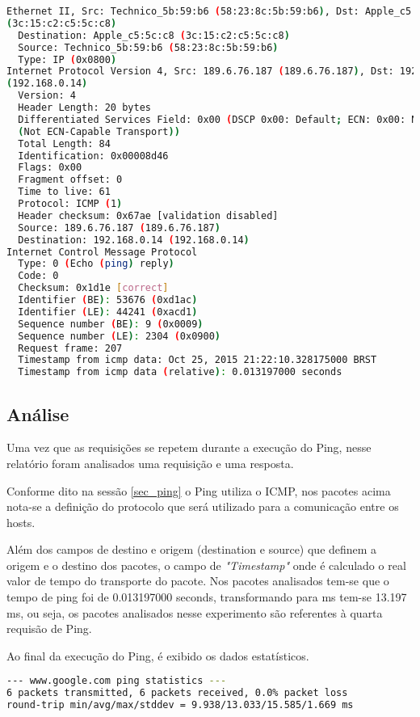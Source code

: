 \documentclass[a4paper]{report} %
\begin{document}
\begin{lstlisting}[language=bash]
Ethernet II, Src: Technico_5b:59:b6 (58:23:8c:5b:59:b6), Dst: Apple_c5:5c:c8
(3c:15:c2:c5:5c:c8)
  Destination: Apple_c5:5c:c8 (3c:15:c2:c5:5c:c8)
  Source: Technico_5b:59:b6 (58:23:8c:5b:59:b6)
  Type: IP (0x0800)
Internet Protocol Version 4, Src: 189.6.76.187 (189.6.76.187), Dst: 192.168.0.14
(192.168.0.14)
  Version: 4
  Header Length: 20 bytes
  Differentiated Services Field: 0x00 (DSCP 0x00: Default; ECN: 0x00: Not-ECT
  (Not ECN-Capable Transport))
  Total Length: 84
  Identification: 0x00008d46
  Flags: 0x00
  Fragment offset: 0
  Time to live: 61
  Protocol: ICMP (1)
  Header checksum: 0x67ae [validation disabled]
  Source: 189.6.76.187 (189.6.76.187)
  Destination: 192.168.0.14 (192.168.0.14)
Internet Control Message Protocol
  Type: 0 (Echo (ping) reply)
  Code: 0
  Checksum: 0x1d1e [correct]
  Identifier (BE): 53676 (0xd1ac)
  Identifier (LE): 44241 (0xacd1)
  Sequence number (BE): 9 (0x0009)
  Sequence number (LE): 2304 (0x0900)
  Request frame: 207
  Timestamp from icmp data: Oct 25, 2015 21:22:10.328175000 BRST
  Timestamp from icmp data (relative): 0.013197000 seconds

\end{lstlisting}

\subsection{Análise}
\label{sub_ping_analise}
Uma vez que as requisições se repetem durante a execução do Ping, nesse relatório foram analisados uma requisição e uma resposta.

Conforme dito na sessão \ref{sec_ping} o Ping utiliza o ICMP, nos pacotes acima nota-se a definição do protocolo que será utilizado para a comunicação entre os hosts.

Além dos campos de destino e origem (destination e source) que definem a origem e o destino dos pacotes, o campo de \textit{"Timestamp"} onde é calculado o real valor de tempo do transporte do pacote. Nos pacotes analisados tem-se que o tempo de ping foi de 0.013197000 seconds, transformando para ms tem-se 13.197 ms, ou seja, os pacotes analisados nesse experimento são referentes à quarta requisão de Ping.

Ao final da execução do Ping, é exibido os dados estatísticos.

\begin{lstlisting}[language=bash]
--- www.google.com ping statistics ---
6 packets transmitted, 6 packets received, 0.0% packet loss
round-trip min/avg/max/stddev = 9.938/13.033/15.585/1.669 ms
\end{lstlisting}
\end{document}
